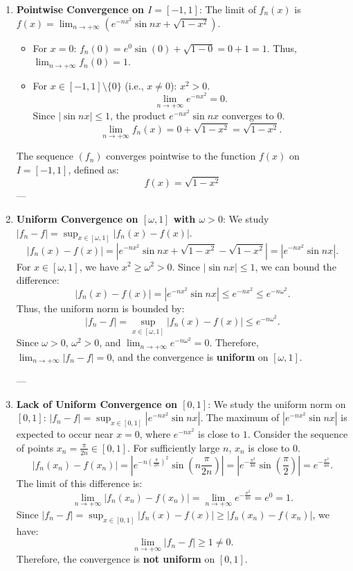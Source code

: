 \documentclass[12pt]{article}
\begin{document}
\begin{correctionbox}
\begin{enumerate}
    \item \textbf{Pointwise Convergence on $I=[-1, 1]$}:
    The limit of $f_n(x)$ is $f(x) = \lim_{n \to +\infty} \left( e^{-nx^2}\sin nx + \sqrt{1-x^2} \right)$.
    \begin{itemize}
        \item For $x=0$: $f_n(0) = e^0 \sin(0) + \sqrt{1-0} = 0 + 1 = 1$. Thus, $\lim_{n \to +\infty} f_n(0) = 1$.
        \item For $x \in [-1, 1] \setminus \{0\}$ (i.e., $x \neq 0$): $x^2 > 0$.
        $$\lim_{n \to +\infty} e^{-nx^2} = 0.$$
        Since $|\sin nx| \leq 1$, the product $e^{-nx^2}\sin nx$ converges to $0$.
        $$\lim_{n \to +\infty} f_n(x) = 0 + \sqrt{1-x^2} = \sqrt{1-x^2}.$$
    \end{itemize}
    The sequence $(f_n)$ converges pointwise to the function $f(x)$ on $I=[-1, 1]$, defined as:
    $$f(x) = \sqrt{1-x^2}$$
    ---

    \item \textbf{Uniform Convergence on $[\omega, 1]$ with $\omega > 0$}:
    We study $|f_n - f| = \sup_{x \in [\omega, 1]} |f_n(x) - f(x)|$.
    $$ |f_n(x) - f(x)| = |e^{-nx^2}\sin nx + \sqrt{1-x^2} - \sqrt{1-x^2}| = |e^{-nx^2}\sin nx|. $$
    For $x \in [\omega, 1]$, we have $x^2 \geq \omega^2 > 0$.
    Since $|\sin nx| \leq 1$, we can bound the difference:
    $$ |f_n(x) - f(x)| = |e^{-nx^2}\sin nx| \leq e^{-nx^2} \leq e^{-n\omega^2}. $$
    Thus, the uniform norm is bounded by:
    $$ |f_n - f| = \sup_{x \in [\omega, 1]} |f_n(x) - f(x)| \leq e^{-n\omega^2}. $$
    Since $\omega > 0$, $\omega^2 > 0$, and $\lim_{n \to +\infty} e^{-n\omega^2} = 0$.
    Therefore, $\lim_{n \to +\infty} |f_n - f| = 0$, and the convergence is \textbf{uniform} on $[\omega, 1]$.

    ---

    \item \textbf{Lack of Uniform Convergence on $[0, 1]$}:
    We study the uniform norm on $[0, 1]$: $|f_n - f| = \sup_{x \in [0, 1]} |e^{-nx^2}\sin nx|$.
    The maximum of $|e^{-nx^2}\sin nx|$ is expected to occur near $x=0$, where $e^{-nx^2}$ is close to $1$.
    Consider the sequence of points $x_n = \frac{\pi}{2n} \in [0, 1]$. For sufficiently large $n$, $x_n$ is close to $0$.
    $$ |f_n(x_n) - f(x_n)| = \left|e^{-n(\frac{\pi}{2n})^2}\sin \left(n\frac{\pi}{2n}\right)\right| = \left|e^{-\frac{\pi^2}{4n}}\sin \left(\frac{\pi}{2}\right)\right| = e^{-\frac{\pi^2}{4n}}. $$
    The limit of this difference is:
    $$ \lim_{n \to +\infty} |f_n(x_n) - f(x_n)| = \lim_{n \to +\infty} e^{-\frac{\pi^2}{4n}} = e^0 = 1. $$
    Since $|f_n - f| = \sup_{x \in [0, 1]} |f_n(x) - f(x)| \geq |f_n(x_n) - f(x_n)|$, we have:
    $$ \lim_{n \to +\infty} |f_n - f| \geq 1 \neq 0. $$
    Therefore, the convergence is \textbf{not uniform} on $[0, 1]$.
\end{enumerate}
\end{correctionbox}
\end{document}

